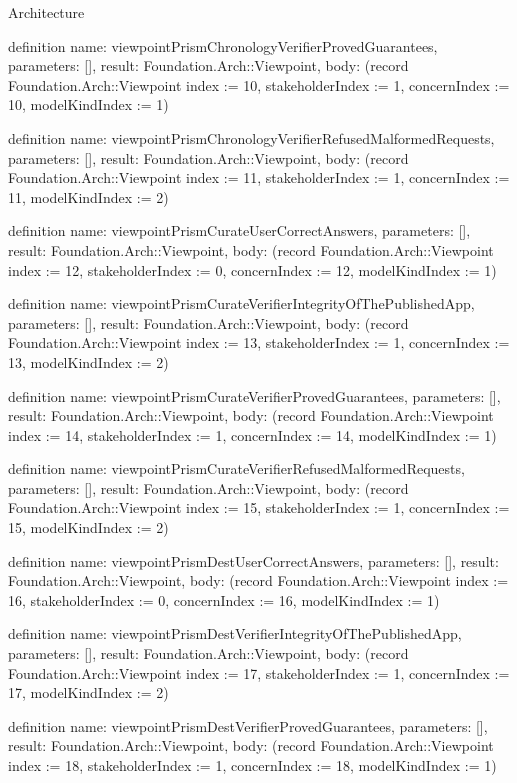 \begin{lexlean}{Architecture}
\begin{semanticmodule}
definition{
  name: viewpointPrismChronologyVerifierProvedGuarantees,
  parameters: [],
  result: Foundation.Arch::Viewpoint,
  body: (record Foundation.Arch::Viewpoint {index := 10, stakeholderIndex := 1, concernIndex := 10, modelKindIndex := 1})
}

definition{
  name: viewpointPrismChronologyVerifierRefusedMalformedRequests,
  parameters: [],
  result: Foundation.Arch::Viewpoint,
  body: (record Foundation.Arch::Viewpoint {index := 11, stakeholderIndex := 1, concernIndex := 11, modelKindIndex := 2})
}

definition{
  name: viewpointPrismCurateUserCorrectAnswers,
  parameters: [],
  result: Foundation.Arch::Viewpoint,
  body: (record Foundation.Arch::Viewpoint {index := 12, stakeholderIndex := 0, concernIndex := 12, modelKindIndex := 1})
}

definition{
  name: viewpointPrismCurateVerifierIntegrityOfThePublishedApp,
  parameters: [],
  result: Foundation.Arch::Viewpoint,
  body: (record Foundation.Arch::Viewpoint {index := 13, stakeholderIndex := 1, concernIndex := 13, modelKindIndex := 2})
}

definition{
  name: viewpointPrismCurateVerifierProvedGuarantees,
  parameters: [],
  result: Foundation.Arch::Viewpoint,
  body: (record Foundation.Arch::Viewpoint {index := 14, stakeholderIndex := 1, concernIndex := 14, modelKindIndex := 1})
}

definition{
  name: viewpointPrismCurateVerifierRefusedMalformedRequests,
  parameters: [],
  result: Foundation.Arch::Viewpoint,
  body: (record Foundation.Arch::Viewpoint {index := 15, stakeholderIndex := 1, concernIndex := 15, modelKindIndex := 2})
}

definition{
  name: viewpointPrismDestUserCorrectAnswers,
  parameters: [],
  result: Foundation.Arch::Viewpoint,
  body: (record Foundation.Arch::Viewpoint {index := 16, stakeholderIndex := 0, concernIndex := 16, modelKindIndex := 1})
}

definition{
  name: viewpointPrismDestVerifierIntegrityOfThePublishedApp,
  parameters: [],
  result: Foundation.Arch::Viewpoint,
  body: (record Foundation.Arch::Viewpoint {index := 17, stakeholderIndex := 1, concernIndex := 17, modelKindIndex := 2})
}

definition{
  name: viewpointPrismDestVerifierProvedGuarantees,
  parameters: [],
  result: Foundation.Arch::Viewpoint,
  body: (record Foundation.Arch::Viewpoint {index := 18, stakeholderIndex := 1, concernIndex := 18, modelKindIndex := 1})
}


\end{semanticmodule}
\end{lexlean}
